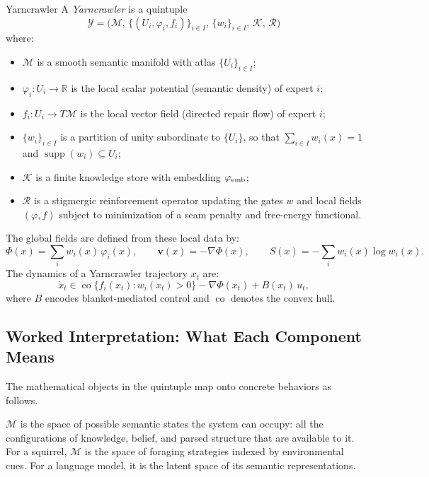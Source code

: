 \begin{definition}{Yarncrawler}
A \emph{Yarncrawler} is a quintuple
\[
  \mathcal{Y} = \bigl(\mathcal{M},\, \{(U_i, \varphi_i, f_i)\}_{i \in I},\,
  \{w_i\}_{i \in I},\, \mathcal{K},\, \mathcal{R}\bigr)
\]
where:
\begin{itemize}
  \item $\mathcal{M}$ is a smooth semantic manifold with atlas $\{U_i\}_{i \in I}$;
  \item $\varphi_i: U_i \to \mathbb{R}$ is the local scalar potential (semantic
        density) of expert $i$;
  \item $f_i: U_i \to T\mathcal{M}$ is the local vector field (directed repair
        flow) of expert $i$;
  \item $\{w_i\}_{i \in I}$ is a partition of unity subordinate to $\{U_i\}$,
        so that $\sum_{i \in I} w_i(x) = 1$ and $\operatorname{supp}(w_i)
        \subseteq U_i$;
  \item $\mathcal{K}$ is a finite knowledge store with embedding $\varphi_{\rm emb}$;
  \item $\mathcal{R}$ is a stigmergic reinforcement operator updating the gates
        $w$ and local fields $(\varphi, f)$ subject to minimization of a seam
        penalty and free-energy functional.
\end{itemize}
The global \RSVP fields are defined from these local data by:
\[
  \Phi(x) = \sum_i w_i(x)\,\varphi_i(x), \qquad
  \mathbf{v}(x) = -\nabla\Phi(x), \qquad
  S(x) = -\sum_i w_i(x)\log w_i(x).
\]
The dynamics of a Yarncrawler trajectory $x_t$ are:
\[
  \dot{x}_t \in \operatorname{co}\{f_i(x_t) : w_i(x_t) > 0\}
             - \nabla\Phi(x_t) + B(x_t)\,u_t,
\]
where $B$ encodes blanket-mediated control and $\operatorname{co}$ denotes the
convex hull.
\end{definition}

\subsection*{Worked Interpretation: What Each Component Means}

The mathematical objects in the quintuple map onto concrete behaviors as follows.

$\mathcal{M}$ is the space of possible semantic states the system can occupy: all the
configurations of knowledge, belief, and parsed structure that are available to it.
For a squirrel, $\mathcal{M}$ is the space of foraging strategies indexed by
environmental cues. For a language model, it is the latent space of its semantic
representations.

